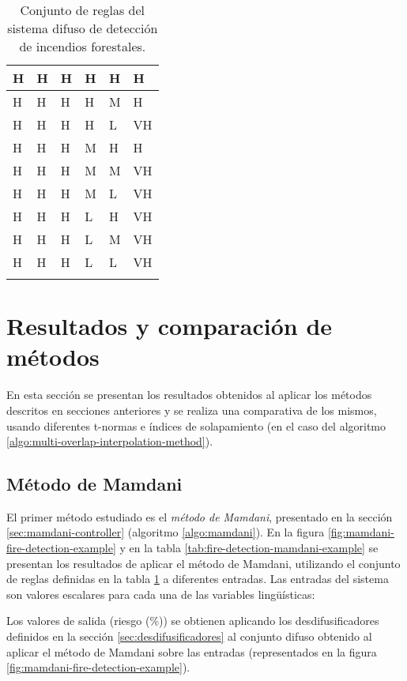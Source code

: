 \begin{center}
\begin{longtable}{| l | l | l | l | l | l |}
    H & H & H & H & H & H \\ \hline 
    H & H & H & H & M & H \\ \hline 
    H & H & H & H & L & VH \\ \hline 
    H & H & H & M & H & H \\ \hline 
    H & H & H & M & M & VH \\ \hline 
    H & H & H & M & L & VH \\ \hline 
    H & H & H & L & H & VH \\ \hline 
    H & H & H & L & M & VH \\ \hline 
    H & H & H & L & L & VH \\
    \hline
    \caption{Conjunto de reglas del sistema difuso de detección de incendios forestales.}
    \label{tab:fire-detection-rule-set}
    \end{longtable}
\end{center}

\section{Resultados y comparación de métodos}
En esta sección se presentan los resultados obtenidos al aplicar los métodos descritos en secciones anteriores y se realiza una comparativa de los mismos, usando diferentes t-normas e índices de solapamiento (en el caso del algoritmo \ref{algo:multi-overlap-interpolation-method}). 

\subsection{Método de Mamdani}
El primer método estudiado es el \emph{método de Mamdani}, presentado en la sección \ref{sec:mamdani-controller} (algoritmo \ref{algo:mamdani}). En la figura \ref{fig:mamdani-fire-detection-example} y en la tabla \ref{tab:fire-detection-mamdani-example} se presentan los resultados de aplicar el método de Mamdani, utilizando el conjunto de reglas definidas en la tabla \ref{tab:fire-detection-rule-set} a diferentes entradas. Las entradas del sistema son valores escalares para cada una de las variables lingüísticas:

\begin{center}
	
\end{center}

Los valores de salida (riesgo (\%)) se obtienen aplicando los desdifusificadores definidos en la sección \ref{sec:desdifusificadores} al conjunto difuso obtenido al aplicar el método de Mamdani sobre las entradas (representados en la figura \ref{fig:mamdani-fire-detection-example}). 

